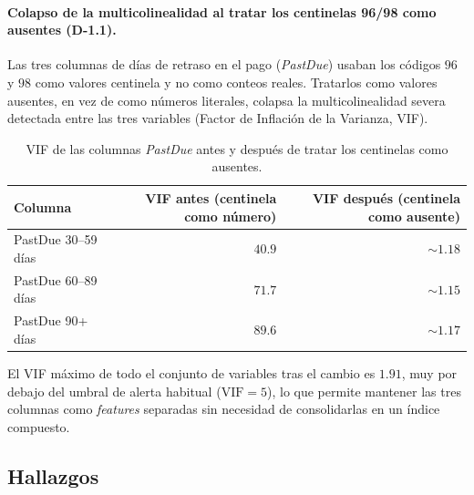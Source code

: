 \documentclass[11pt,a4paper]{article}
\begin{document}
\paragraph{Colapso de la multicolinealidad al tratar los centinelas 96/98 como ausentes (D-1.1).}
Las tres columnas de días de retraso en el pago (\emph{PastDue}) usaban los códigos $96$ y $98$ como
valores centinela y no como conteos reales. Tratarlos como valores ausentes, en vez de como números
literales, colapsa la multicolinealidad severa detectada entre las tres variables (Factor de
Inflación de la Varianza, VIF).

\begin{table}[H]
\centering
\caption{VIF de las columnas \emph{PastDue} antes y después de tratar los centinelas como ausentes.}
\label{tab:vif-colapso}
\begin{tabular}{lrr}
\toprule
Columna & VIF antes (centinela como número) & VIF después (centinela como ausente) \\
\midrule
PastDue 30--59 días & $40.9$ & $\sim 1.18$ \\
PastDue 60--89 días & $71.7$ & $\sim 1.15$ \\
PastDue 90+ días & $89.6$ & $\sim 1.17$ \\
\bottomrule
\end{tabular}
\end{table}

El VIF máximo de todo el conjunto de variables tras el cambio es $1.91$, muy por debajo del umbral
de alerta habitual ($\mathrm{VIF}=5$), lo que permite mantener las tres columnas como \emph{features}
separadas sin necesidad de consolidarlas en un índice compuesto.

\subsection{Hallazgos}
\end{document}
